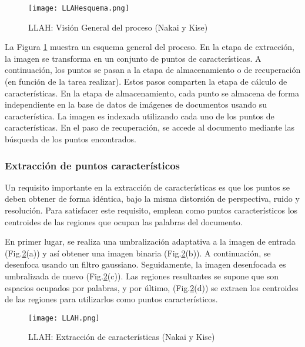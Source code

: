 \begin{figure}
  \centering
  \texttt{[image: LLAHesquema.png]}
  \caption{LLAH: Visión General del proceso (Nakai y Kise)}
  \label{fig:overview}
\end{figure}

La Figura \ref{fig:overview} muestra un esquema general del proceso. En la etapa de extracción, la imagen se transforma en un conjunto de puntos de características. A continuación, los puntos se pasan a la etapa de almacenamiento o de recuperación (en función de la tarea  realizar). Estos pasos comparten la etapa de cálculo de características. En la etapa de almacenamiento, cada punto se almacena de forma independiente en la base de datos de imágenes de documentos usando su característica. La imagen es indexada utilizando cada uno de los puntos de características. En el paso de recuperación, se accede al  documento mediante las búsqueda de los puntos encontrados.

\subsubsection{Extracción de puntos característicos}
Un requisito importante en la extracción de características es que los puntos se deben obtener de forma idéntica, bajo la misma distorsión de perspectiva, ruido y resolución. Para satisfacer este requisito, emplean como puntos característicos los centroides de las regiones que ocupan las palabras del documento.

En primer lugar, se realiza una umbralización adaptativa a la imagen de entrada (Fig.\ref{fig:extraccion}(a)) y así obtener una imagen binaria (Fig.\ref{fig:extraccion}(b)). A continuación, se desenfoca usando un filtro gaussiano. Seguidamente, la imagen desenfocada es umbralizada de nuevo (Fig.\ref{fig:extraccion}(c)). Las regiones resultantes se supone que son espacios ocupados por palabras, y por último, (Fig.\ref{fig:extraccion}(d)) se extraen los centroides de las regiones para utilizarlos como puntos característicos.

\begin{figure}
  \centering
  \texttt{[image: LLAH.png]}
  \caption{LLAH: Extracción de características (Nakai y Kise)}
  \label{fig:extraccion}
\end{figure}

